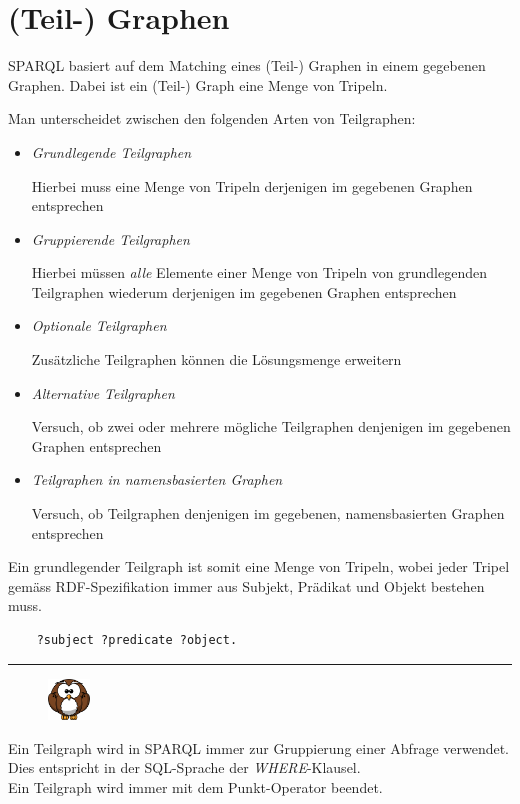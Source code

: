 \section{(Teil-) Graphen}
\label{sec:sparql_graph}

SPARQL basiert auf dem Matching eines (Teil-) Graphen in einem gegebenen Graphen. Dabei ist ein (Teil-) Graph eine Menge von Tripeln.

Man unterscheidet zwischen den folgenden Arten von Teilgraphen:
\begin{itemize}
\item \textit{Grundlegende Teilgraphen}

Hierbei muss eine Menge von Tripeln derjenigen im gegebenen Graphen entsprechen

\item \textit{Gruppierende Teilgraphen}

Hierbei müssen \textit{alle} Elemente einer Menge von Tripeln von grundlegenden Teilgraphen wiederum derjenigen im gegebenen Graphen entsprechen

\item \textit{Optionale Teilgraphen}

Zusätzliche Teilgraphen können die Lösungsmenge erweitern

\item \textit{Alternative Teilgraphen}

Versuch, ob zwei oder mehrere mögliche Teilgraphen denjenigen im gegebenen Graphen entsprechen

\item \textit{Teilgraphen in namensbasierten Graphen}

Versuch, ob Teilgraphen denjenigen im gegebenen, namensbasierten Graphen entsprechen
\end{itemize}

Ein grundlegender Teilgraph ist somit eine Menge von Tripeln, wobei jeder Tripel gemäss RDF-Spezifikation immer aus Subjekt, Prädikat und Objekt bestehen muss.~\cite[3.1 Triples]{w3rdf}

\begin{lstlisting}
    ?subject ?predicate ?object.
\end{lstlisting}

\noindent\rule[1ex]{\textwidth}{1pt}
\begin{figure}
    \vspace{-16pt}
    \includegraphics[width=0.1\textwidth]{bilder/owl.png}
\end{figure}
Ein Teilgraph wird in SPARQL immer zur Gruppierung einer Abfrage verwendet. Dies entspricht in der SQL-Sprache der \textit{WHERE}-Klausel.\\
Ein Teilgraph wird immer mit dem Punkt-Operator beendet.

